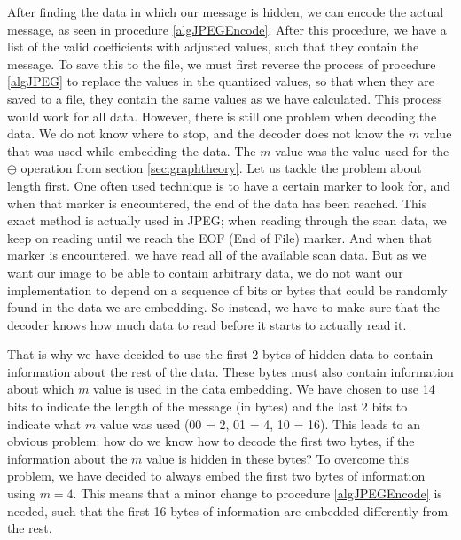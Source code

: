 After finding the data in which our message is hidden, we can encode the actual message, as seen in procedure \ref{algJPEGEncode}. 
After this procedure, we have a list of the valid coefficients with adjusted values, such that they contain the message. 
To save this to the file, we must first reverse the process of procedure \ref{algJPEG} to replace the values in the quantized values, so that when they are saved to a file, they contain the same values as we have calculated. 
This process would work for all data. However, there is still one problem when decoding the data. We do not know where to stop, and the decoder does not know the $m$ value that was used while embedding the data. The $m$ value was the value used for the $\oplus$ operation from section \ref{sec:graphtheory}.
Let us tackle the problem about length first. 
One often used technique is to have a certain marker to look for, and when that marker is encountered, the end of the data has been reached. 
This exact method is actually used in JPEG; when reading through the scan data, we keep on reading until we reach the EOF (End of File) marker. 
And when that marker is encountered, we have read all of the available scan data. 
But as we want our image to be able to contain arbitrary data, we do not want our implementation to depend on a sequence of bits or bytes that could be randomly found in the data we are embedding. 
So instead, we have to make sure that the decoder knows how much data to read before it starts to actually read it. 

That is why we have decided to use the first 2 bytes of hidden data to contain information about the rest of the data. 
These bytes must also contain information about which $m$ value is used in the data embedding. 
We have chosen to use 14 bits to indicate the length of the message (in bytes) and the last 2 bits to indicate what $m$ value was used (00 = 2, 01 = 4, 10 = 16). 
This leads to an obvious problem: how do we know how to decode the first two bytes, if the information about the $m$ value is hidden in these bytes? To overcome this problem, we have decided to always embed the first two bytes of information using $m = 4$. 
This means that a minor change to procedure \ref{algJPEGEncode} is needed, such that the first 16 bytes of information are embedded differently from the rest.

